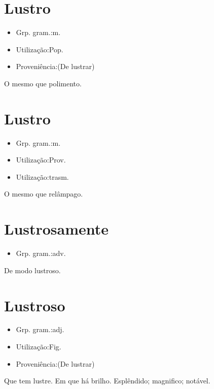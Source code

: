 \section{Lustro}
\begin{itemize}
\item {Grp. gram.:m.}
\end{itemize}
\begin{itemize}
\item {Utilização:Pop.}
\end{itemize}
\begin{itemize}
\item {Proveniência:(De \textunderscore lustrar\textunderscore )}
\end{itemize}
O mesmo que \textunderscore polimento\textunderscore .
\section{Lustro}
\begin{itemize}
\item {Grp. gram.:m.}
\end{itemize}
\begin{itemize}
\item {Utilização:Prov.}
\end{itemize}
\begin{itemize}
\item {Utilização:trasm.}
\end{itemize}
O mesmo que \textunderscore relâmpago\textunderscore .
\section{Lustrosamente}
\begin{itemize}
\item {Grp. gram.:adv.}
\end{itemize}
De modo lustroso.
\section{Lustroso}
\begin{itemize}
\item {Grp. gram.:adj.}
\end{itemize}
\begin{itemize}
\item {Utilização:Fig.}
\end{itemize}
\begin{itemize}
\item {Proveniência:(De \textunderscore lustrar\textunderscore )}
\end{itemize}
Que tem lustre.
Em que há brilho.
Esplêndido; magnifico; notável.

